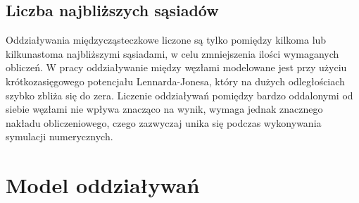 \documentclass[12pt, letterpaper]{report}
\begin{document}
    \subsection{Liczba najbliższych sąsiadów}
    Oddziaływania międzycząsteczkowe liczone są tylko pomiędzy kilkoma lub kilkunastoma najbliższymi 
    sąsiadami, w celu zmniejszenia ilości wymaganych obliczeń. W pracy oddziaływanie między węzłami 
    modelowane jest przy użyciu krótkozasięgowego potencjału Lennarda-Jonesa, który na dużych 
    odległościach szybko zbliża się do zera. Liczenie oddziaływań pomiędzy bardzo oddalonymi od 
    siebie węzłami nie wpływa znacząco na wynik, wymaga jednak znacznego nakładu obliczeniowego, 
    czego zazwyczaj unika się podczas wykonywania symulacji numerycznych.


    \section{Model oddziaływań}
    \label{sec:model}
\end{document}
